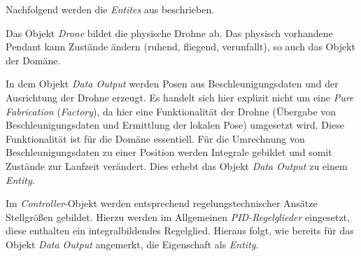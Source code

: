 Nachfolgend werden die \textit{Entites} aus  beschrieben.


Das Objekt \textit{Drone} bildet die physische Drohne ab. Das physisch vorhandene Pendant kann Zustände ändern (ruhend, fliegend, verunfallt), so auch das Objekt der Domäne. 


In dem Objekt \textit{Data Output} werden Posen aus Beschleunigungsdaten und der Ausrichtung der Drohne erzeugt. Es handelt sich hier explizit nicht um eine \textit{Pure Fabrication} (\textit{Factory}), da hier eine Funktionalität der Drohne (Übergabe von Beschleunigungsdaten und Ermittlung der lokalen Pose) umgesetzt wird. Diese Funktionalität ist für die Domäne essentiell.
Für die Umrechnung von Beschleunigungsdaten zu einer Position werden Integrale gebildet und somit Zustände zur Laufzeit verändert. Dies erhebt das Objekt \textit{Data Output} zu einem \textit{Entity}.


Im \textit{Controller}-Objekt werden entsprechend regelungstechnischer Ansätze Stellgrößen gebildet. Hierzu werden im Allgemeinen \textit{PID-Regelglieder} eingesetzt, diese enthalten ein integralbildendes Regelglied. Hieraus folgt, wie bereits für das Objekt \textit{Data Output} angemerkt, die Eigenschaft als \textit{Entity}.











